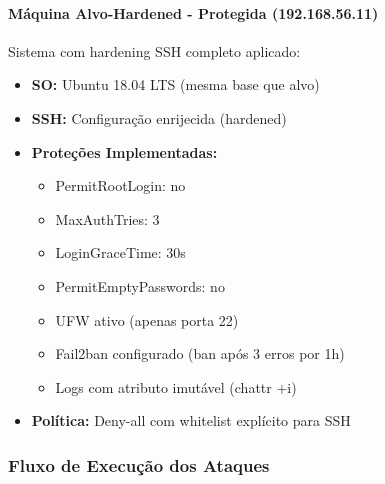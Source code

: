 \documentclass[12pt]{article}
\begin{document}
\paragraph{Máquina Alvo-Hardened - Protegida (192.168.56.11)}
Sistema com hardening SSH completo aplicado:
\begin{itemize}
    \item \textbf{SO:} Ubuntu 18.04 LTS (mesma base que alvo)
    \item \textbf{SSH:} Configuração enrijecida (hardened)
    \item \textbf{Proteções Implementadas:}
        \begin{itemize}
            \item PermitRootLogin: no
            \item MaxAuthTries: 3
            \item LoginGraceTime: 30s
            \item PermitEmptyPasswords: no
            \item UFW ativo (apenas porta 22)
            \item Fail2ban configurado (ban após 3 erros por 1h)
            \item Logs com atributo imutável (chattr +i)
        \end{itemize}
    \item \textbf{Política:} Deny-all com whitelist explícito para SSH
\end{itemize}

\subsubsection{Fluxo de Execução dos Ataques}
\end{document}
